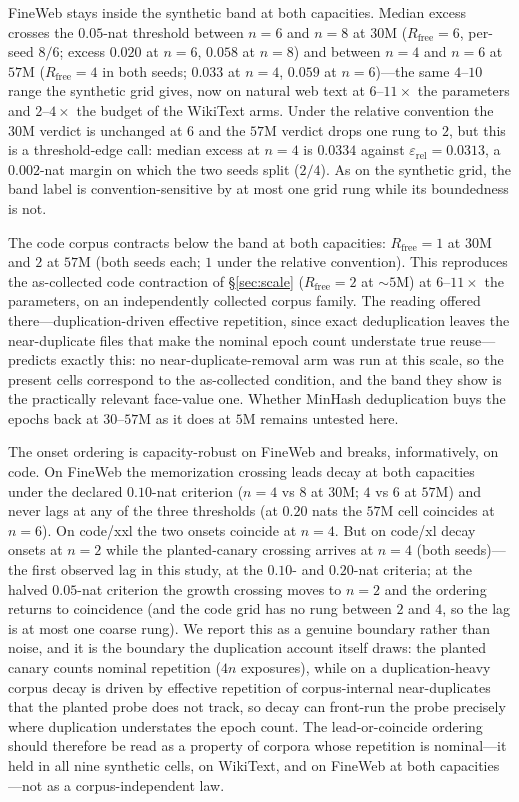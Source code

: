 \documentclass[11pt]{article}
\begin{document}
FineWeb stays inside the synthetic band at both capacities. Median excess crosses
the $0.05$-nat threshold between $n=6$ and $n=8$ at $30$M
($R_{\mathrm{free}}=6$, per-seed $8/6$; excess $0.020$ at $n=6$, $0.058$ at $n=8$)
and between $n=4$ and $n=6$ at $57$M ($R_{\mathrm{free}}=4$ in both seeds; $0.033$
at $n=4$, $0.059$ at $n=6$)---the same $4$--$10$ range the synthetic grid gives,
now on natural web text at $6$--$11\times$ the parameters and $2$--$4\times$ the
budget of the WikiText arms. Under the relative convention the $30$M verdict is
unchanged at $6$ and the $57$M verdict drops one rung to $2$, but this is a
threshold-edge call: median excess at $n=4$ is $0.0334$ against
$\varepsilon_{\mathrm{rel}}=0.0313$, a $0.002$-nat margin on which the two seeds
split ($2/4$). As on the synthetic grid, the band label is convention-sensitive by
at most one grid rung while its boundedness is not.

The code corpus contracts below the band at both capacities:
$R_{\mathrm{free}}=1$ at $30$M and $2$ at $57$M (both seeds each; $1$ under the
relative convention). This reproduces the as-collected code contraction of
\S\ref{sec:scale} ($R_{\mathrm{free}}=2$ at ${\sim}5$M) at $6$--$11\times$ the
parameters, on an independently collected corpus family. The reading offered
there---duplication-driven effective repetition, since exact deduplication leaves
the near-duplicate files that make the nominal epoch count understate true
reuse---predicts exactly this: no near-duplicate-removal arm was run at this
scale, so the present cells correspond to the as-collected condition, and the
band they show is the practically relevant face-value one. Whether MinHash
deduplication buys the epochs back at $30$--$57$M as it does at $5$M remains
untested here.

The onset ordering is capacity-robust on FineWeb and breaks, informatively, on
code. On FineWeb the memorization crossing leads decay at both capacities under
the declared $0.10$-nat criterion ($n=4$ vs $8$ at $30$M; $4$ vs $6$ at $57$M)
and never lags at any of the three thresholds (at $0.20$ nats the $57$M cell
coincides at $n=6$). On code/xxl the two onsets coincide at $n=4$. But on
code/xl decay onsets at $n=2$ while the planted-canary crossing arrives at
$n=4$ (both seeds)---the first observed lag in this study, at the $0.10$- and
$0.20$-nat criteria; at the halved $0.05$-nat criterion the growth crossing
moves to $n=2$ and the ordering returns to coincidence (and the code grid has
no rung between $2$ and $4$, so the lag is at most one coarse rung). We report
this as a genuine boundary rather than noise, and it is the boundary the
duplication account itself draws: the planted canary counts nominal repetition
($4n$ exposures), while on a duplication-heavy corpus decay is driven by
effective repetition of corpus-internal near-duplicates that the planted probe
does not track, so decay can front-run the probe precisely where duplication
understates the epoch count. The lead-or-coincide ordering should therefore be
read as a property of corpora whose repetition is nominal---it held in all nine
synthetic cells, on WikiText, and on FineWeb at both capacities---not as a
corpus-independent law.
\end{document}
